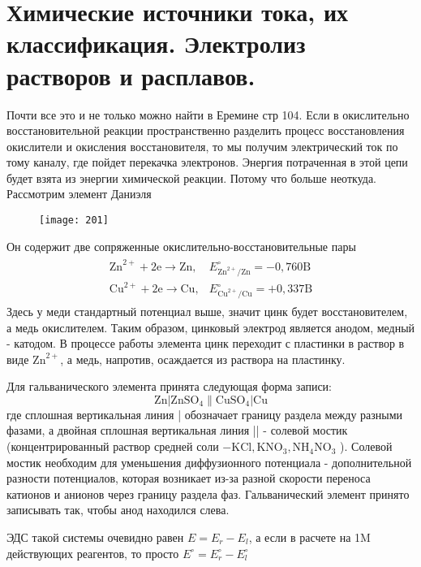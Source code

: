 
	\section{Химические источники тока, их классификация. Электролиз растворов и расплавов.}
	Почти все это и не только можно найти в Еремине стр 104.
	Если в окислительно восстановительной реакции пространственно разделить процесс восстановления окислители и окисления восстановителя, то мы получим электрический ток по тому каналу, где пойдет перекачка электронов. Энергия потраченная в этой цепи будет взята из энергии химической реакции. Потому что больше неоткуда.
	Рассмотрим элемент Даниэля
	\begin{figure}[H]
		\texttt{[image: 201]}
	\end{figure}
 	Он содержит две сопряженные окислительно-восстановительные пары 
 	\begin{align*}
 	\begin{array}{ll}
 	\mathrm{Zn}^{2+}+2 \mathrm{e} \rightarrow \mathrm{Zn}, & E_{\mathrm{Zn}^{2+} / \mathrm{Zn}}^{\circ}=-0,760 \mathrm{B} \\
 	\mathrm{Cu}^{2+}+2 \mathrm{e} \rightarrow \mathrm{Cu}, & E_{\mathrm{Cu}^{2+} / \mathrm{Cu}}^{\circ}=+0,337 \mathrm{B}
 	\end{array}	
 	\end{align*}
 	Здесь у меди стандартный потенциал выше, значит цинк будет восстановителем, а медь окислителем. Таким образом, цинковый электрод является анодом, медный - катодом. В процессе работы элемента цинк переходит с пластинки в раствор в виде $\mathrm{Zn}^{2+}$, а медь, напротив, осаждается из раствора на пластинку.
 	
 	Для гальванического элемента принята следующая форма записи:
 	$$
 	\mathrm{Zn}\left|\mathrm{ZnSO}_{4} \| \mathrm{CuSO}_{4}\right| \mathrm{Cu}
 	$$
 	где сплошная вертикальная линия | обозначает границу раздела между разными фазами, а двойная сплошная вертикальная линия || - солевой мостик (концентрированный раствор средней соли $-\mathrm{KCl}, \mathrm{KNO}_{3}, \mathrm{NH}_{4} \mathrm{NO}_{3}$ ). Солевой мостик необходим для уменьшения диффузионного потенциала - дополнительной разности потенциалов, которая возникает из-за разной скорости переноса катионов и анионов через границу раздела фаз. Гальванический элемент принято записывать так, чтобы анод находился слева.
 	
 	ЭДС такой системы очевидно равен $E = E_r - E_l$, а если в расчете на 1M действующих реагентов, то просто $E^\circ = E_r^\circ - E_l^\circ$
	
